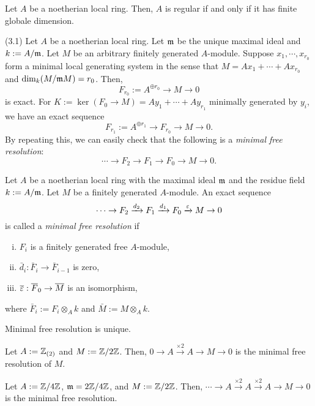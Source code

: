 \documentclass{../../../small}
\begin{document}
\begin{thm*}
Let $A$ be a noetherian local ring.
Then, $A$ is regular if and only if it has finite globale dimension.
\end{thm*}

(3.1)
Let $A$ be a noetherian local ring.
Let $\mathfrak{m}$ be the unique maximal ideal and $k:=A/\mathfrak{m}$.
Let $M$ be an arbitrary finitely generated $A$-module.
Suppose $x_1,\cdots,x_{r_0}$ form a minimal local generating system in the sense that $M=Ax_1+\cdots+Ax_{r_0}$ and $\dim_k(M/\mathfrak{m} M)=r_0$.
Then,
\[F_{r_0}:=A^{\oplus r_0}\to M\to0\]
is exact.
For $K:=\ker(F_0\to M)=Ay_1+\cdots+Ay_{r_1}$ minimally generated by $y_i$, we have an exact sequence
\[F_{r_1}:=A^{\oplus r_1}\to F_{r_0}\to M\to0.\]
By repeating this, we can easily check that the following is a \emph{minimal free resolution}:
\[\cdots\to F_2\to F_1\to F_0\to M\to0.\]

\begin{defn*}[3.2]
Let $A$ be a noetherian local ring with the maximal ideal $\mathfrak{m}$ and the residue field $k:=A/\mathfrak{m}$.
Let $M$ be a finitely generated $A$-module.
An exact sequence
\[\cdots\to F_2\xrightarrow{d_2} F_1\xrightarrow{d_1} F_0\xrightarrow{\varepsilon} M\to0\]
is called a \emph{minimal free resolution} if
\begin{enumerate}[(i)]
\item $F_i$ is a finitely generated free $A$-module,
\item $\bar d_i:\bar F_i\to\bar F_{i-1}$ is zero,
\item $\overline{\varepsilon}:\overline F_0\to\overline M$ is an isomorphism,
\end{enumerate}
where $\bar F_i:=F_i\otimes_Ak$ and $\bar M:=M\otimes_Ak$.
\end{defn*}

\begin{rmk*}[3.3]
Minimal free resolution is unique.
\end{rmk*}

\begin{ex*}[3.4]
Let $A:=\mathbb{Z}_{(2)}$ and $M:=\mathbb{Z}/2\mathbb{Z}$.
Then, $0\to A\xrightarrow{\times2}A\to M\to0$ is the minimal free resolution of $M$.

Let $A:=\mathbb{Z}/4\mathbb{Z}$, $\mathfrak{m}=2\mathbb{Z}/4\mathbb{Z}$, and $M:=\mathbb{Z}/2\mathbb{Z}$.
Then, $\cdots\to A\xrightarrow{\times2}A\xrightarrow{\times2}A\to M\to0$ is the minimal free resolution.
\end{ex*}
\end{document}
